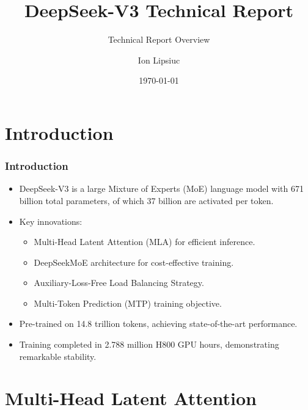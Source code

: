 \documentclass{beamer}
\title{DeepSeek-V3 Technical Report}
\subtitle{Technical Report Overview}
\author{Ion Lipsiuc}
\institute{lipsiuci@tcd.ie}
\date{\today}
\begin{document}
\begin{frame}
    \titlepage
\end{frame}

\section{Introduction}

\begin{frame}
    \frametitle{Introduction}
    \begin{itemize}
        \item DeepSeek-V3 is a large Mixture of Experts (MoE) language model with 671 billion total parameters, of which 37 billion are activated per token.
        \item Key innovations:
              \begin{itemize}
                  \item Multi-Head Latent Attention (MLA) for efficient inference.
                  \item DeepSeekMoE architecture for cost-effective training.
                  \item Auxiliary-Loss-Free Load Balancing Strategy.
                  \item Multi-Token Prediction (MTP) training objective.
              \end{itemize}
        \item Pre-trained on 14.8 trillion tokens, achieving state-of-the-art performance.
        \item Training completed in 2.788 million H800 GPU hours, demonstrating remarkable stability.
    \end{itemize}
\end{frame}

\section{Multi-Head Latent Attention}
\end{document}
